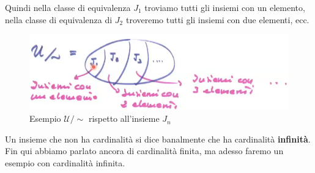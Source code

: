 \documentclass{article}
\begin{document}
Quindi nella classe di equivalenza $J_1$ troviamo tutti gli insiemi con un
elemento, nella classe di equivalenza di $J_2$ troveremo tutti gli insiemi con due elementi, ecc.
\begin{figure}[H]
    \centering
    \includegraphics[scale=0.5]{images/U_insiemi_esemp_card2.png}
    \caption{Esempio $\mathcal{U}/\sim$ rispetto all'insieme $J_n$}
\end{figure}
Un insieme che non ha cardinalità si dice banalmente che ha cardinalità \textbf{infinità}. Fin qui abbiamo
parlato ancora di cardinalità finita, ma adesso faremo un esempio con cardinalità infinita.
\end{document}

